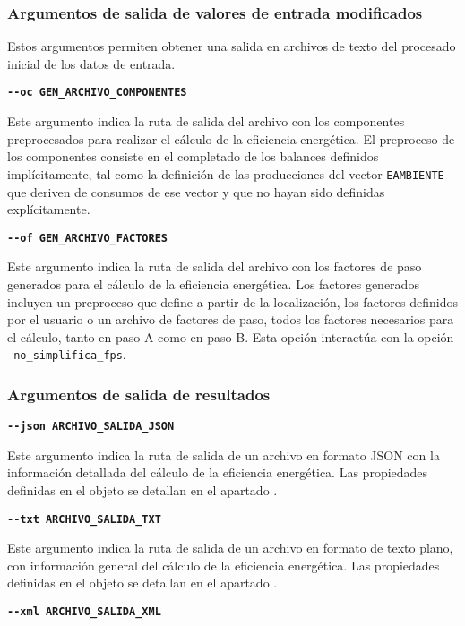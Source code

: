 \documentclass[10pt,notitlepage,oneside,a4paper]{article}
\begin{document}
\subsubsection{Argumentos de salida de valores de entrada modificados}

Estos argumentos permiten obtener una salida en archivos de texto del procesado inicial de los datos de entrada.

\textbf{\texttt{-{}-oc GEN\_ARCHIVO\_COMPONENTES}}

Este argumento indica la ruta de salida del archivo con los componentes preprocesados para realizar el cálculo de la eficiencia energética. El preproceso de los componentes consiste en el completado de los balances definidos implícitamente, tal como la definición de las producciones del vector \texttt{EAMBIENTE} que deriven de consumos de ese vector y que no hayan sido definidas explícitamente.

\textbf{\texttt{-{}-of GEN\_ARCHIVO\_FACTORES}}

Este argumento indica la ruta de salida del archivo con los factores de paso generados para el cálculo de la eficiencia energética. Los factores generados incluyen un preproceso que define a partir de la localización, los factores definidos por el usuario o un archivo de factores de paso, todos los factores necesarios para el cálculo, tanto en paso A como en paso B. Esta opción interactúa con la opción \texttt{--no\_simplifica\_fps}.

\subsubsection{Argumentos de salida de resultados}

\textbf{\texttt{-{}-json ARCHIVO\_SALIDA\_JSON}}

Este argumento indica la ruta de salida de un archivo en formato JSON con la información detallada del cálculo de la eficiencia energética. Las propiedades definidas en el objeto se detallan en el apartado .

\textbf{\texttt{-{}-txt ARCHIVO\_SALIDA\_TXT}}

Este argumento indica la ruta de salida de un archivo en formato de texto plano, con información general del cálculo de la eficiencia energética. Las propiedades definidas en el objeto se detallan en el apartado .

\textbf{\texttt{-{}-xml ARCHIVO\_SALIDA\_XML}}
\end{document}
